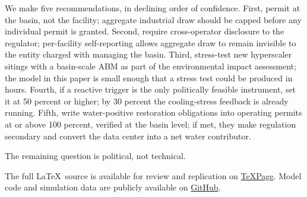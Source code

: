 \documentclass[sigconf,nonacm]{acmart}
\begin{document}
We make five recommendations, in declining order of confidence. First, permit at the basin, not the facility; aggregate industrial draw should be capped before any individual permit is granted. Second, require cross-operator disclosure to the regulator; per-facility self-reporting allows aggregate draw to remain invisible to the entity charged with managing the basin. Third, stress-test new hyperscaler sitings with a basin-scale ABM as part of the environmental impact assessment; the model in this paper is small enough that a stress test could be produced in hours. Fourth, if a reactive trigger is the only politically feasible instrument, set it at 50 percent or higher; by 30 percent the cooling-stress feedback is already running. Fifth, write water-positive restoration obligations into operating permits at or above 100 percent, verified at the basin level; if met, they make regulation secondary and convert the data center into a net water contributor.

The remaining question is political, not technical.

\begin{acks}
The full \LaTeX\ source is available for review and replication on
\href{https://www.texpage.com/share/153c6d3ebf6441b1a0d91e9bbd119599}{TeXPage}.
Model code and simulation data are publicly available on
\href{https://github.com/cup-noodlehS/ABM-project}{GitHub}.
\end{acks}



\end{document}
